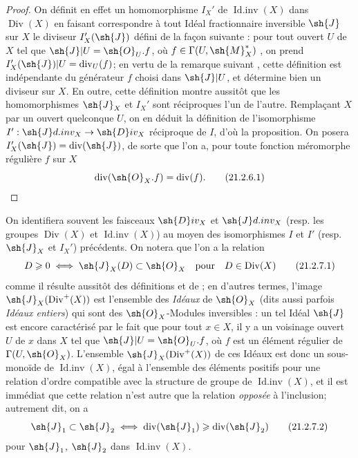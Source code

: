 \begin{proof}
On définit en effet un homomorphisme $I_X'$ de $\operatorname{Id.inv}(X)$ dans $\operatorname{Div}(X)$ en faisant correspondre à tout Idéal fractionnaire inversible $\sh{J}$ sur $X$ le diviseur $I_X'(\sh{J})$ défini de la façon suivante : pour tout ouvert $U$ de $X$ tel que $\sh{J}|U=\sh{O}_U.f$, où $f\in\Gamma(U,\sh{M}_X^*)$ , on prend $I_X'(\sh{J})|U=\operatorname{div}_U(f)$;
en vertu de la remarque suivant , cette définition est indépendante du générateur $f$ choisi dans $\sh{J}|U$, et détermine bien un diviseur sur $X$.
En outre, cette définition montre aussitôt que les homomorphismes $\sh{J}_X$ et $I_X'$ sont réciproques l'un de l'autre.
Remplaçant $X$ par un ouvert quelconque $U$, on en déduit la définition de l'isomorphisme $I':\sh{J}d.inv_X\to\sh{D}iv_X$ réciproque de $I$, d'où la proposition.
On posera $I_X'(\sh{J})=\operatorname{div}(\sh{J})$, de sorte que l'on a, pour toute fonction méromorphe régulière $f$ sur $X$
\[
\label{IV.21.2.6.1}
  \operatorname{div}(\sh{O}_X.f)=\operatorname{div}(f).
  \tag{21.2.6.1}
\]
\end{proof}

\begin{env}[21.2.7]
\label{IV.21.2.7}
On identifiera souvent les faisceaux $\sh{D}iv_X$ et $\sh{J}d.inv_X$ (resp. les groupes $\operatorname{Div}(X)$ et $\operatorname{Id.inv}(X)$) au moyen des isomorphismes $I$ et $I'$ (resp. $\sh{J}_X$ et $I_X'$) précédents.
On notera que l'on a la relation
\[
\label{IV.21.2.7.1}
  D\geq0 \iff \sh{J}_X(D)\subset\sh{O}_X \quad\text{pour}\quad D\in\operatorname{Div}(X)
  \tag{21.2.7.1}
\]
comme il résulte aussitôt des définitions  et de ;
en d'autres termes, l'image $\sh{J}_X(\operatorname{Div}^+(X))$ est l'ensemble des \emph{Idéaux} de $\sh{O}_X$ (dits aussi parfois \emph{Idéaux entiers}) qui sont des $\sh{O}_X$-Modules inversibles : un tel Idéal $\sh{J}$ est encore caractérisé par le fait que pour tout $x\in X$, il y a un voisinage ouvert $U$ de $x$ dans $X$ tel que $\sh{J}|U=\sh{O}_U.f$, où $f$ est un élément régulier de $\Gamma(U,\sh{O}_X)$.
L'ensemble $\sh{J}_X(\operatorname{Div}^+(X))$ de ces Idéaux est donc un sous-monoïde de $\operatorname{Id.inv}(X)$, égal à l'ensemble des éléments positifs pour une relation d'ordre compatible avec la structure de groupe de $\operatorname{Id.inv}(X)$, et il est immédiat que cette relation n'est autre que la relation \emph{opposée} à l'inclusion;
autrement dit, on a
\[
\label{IV.21.2.7.2}
  \sh{J}_1\subset\sh{J}_2 \iff \operatorname{div}(\sh{J}_1)\geq\operatorname{div}(\sh{J}_2)
  \tag{21.2.7.2}
\]
pour $\sh{J}_1$, $\sh{J}_2$ dans $\operatorname{Id.inv}(X)$.
\end{env}

